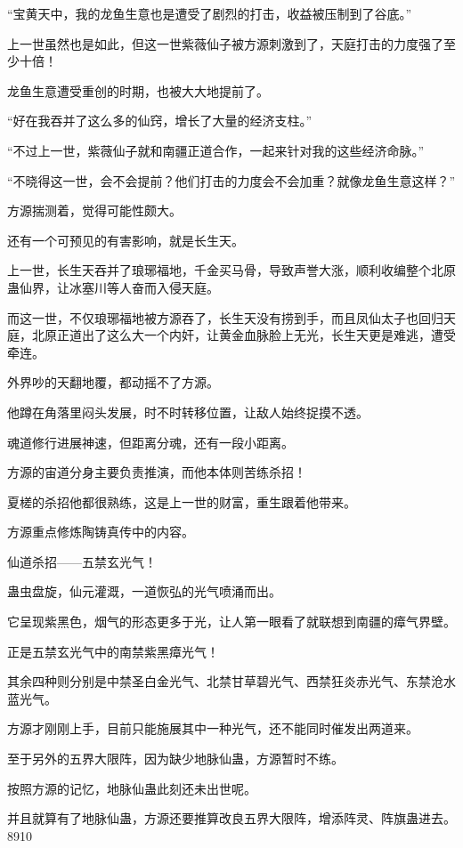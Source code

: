 \begin{this_body}
“宝黄天中，我的龙鱼生意也是遭受了剧烈的打击，收益被压制到了谷底。”

上一世虽然也是如此，但这一世紫薇仙子被方源刺激到了，天庭打击的力度强了至少十倍！

龙鱼生意遭受重创的时期，也被大大地提前了。

“好在我吞并了这么多的仙窍，增长了大量的经济支柱。”

“不过上一世，紫薇仙子就和南疆正道合作，一起来针对我的这些经济命脉。”

“不晓得这一世，会不会提前？他们打击的力度会不会加重？就像龙鱼生意这样？”

方源揣测着，觉得可能性颇大。

还有一个可预见的有害影响，就是长生天。

上一世，长生天吞并了琅琊福地，千金买马骨，导致声誉大涨，顺利收编整个北原蛊仙界，让冰塞川等人奋而入侵天庭。

而这一世，不仅琅琊福地被方源吞了，长生天没有捞到手，而且凤仙太子也回归天庭，北原正道出了这么大一个内奸，让黄金血脉脸上无光，长生天更是难逃，遭受牵连。

外界吵的天翻地覆，都动摇不了方源。

他蹲在角落里闷头发展，时不时转移位置，让敌人始终捉摸不透。

魂道修行进展神速，但距离分魂，还有一段小距离。

方源的宙道分身主要负责推演，而他本体则苦练杀招！

夏槎的杀招他都很熟练，这是上一世的财富，重生跟着他带来。

方源重点修炼陶铸真传中的内容。

仙道杀招——五禁玄光气！

蛊虫盘旋，仙元灌溉，一道恢弘的光气喷涌而出。

它呈现紫黑色，烟气的形态更多于光，让人第一眼看了就联想到南疆的瘴气界壁。

正是五禁玄光气中的南禁紫黑瘴光气！

其余四种则分别是中禁圣白金光气、北禁甘草碧光气、西禁狂炎赤光气、东禁沧水蓝光气。

方源才刚刚上手，目前只能施展其中一种光气，还不能同时催发出两道来。

至于另外的五界大限阵，因为缺少地脉仙蛊，方源暂时不练。

按照方源的记忆，地脉仙蛊此刻还未出世呢。

并且就算有了地脉仙蛊，方源还要推算改良五界大限阵，增添阵灵、阵旗蛊进去。8910

\end{this_body}

